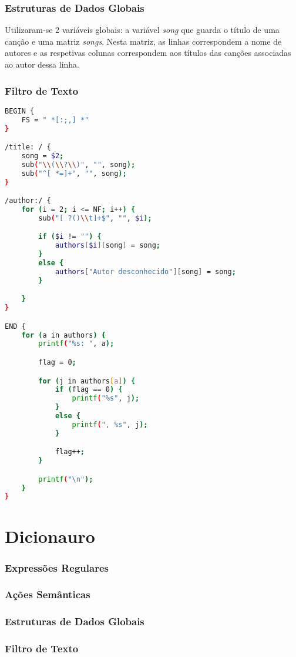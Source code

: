 \documentclass{article}
\begin{document}
\subsubsection{Estruturas de Dados Globais}

Utilizaram-se 2 variáveis globais: a variável \emph{song} que guarda o título de uma canção e uma matriz \emph{songs}. Nesta matriz, as linhas correspondem a nome de autores e as respetivas colunas correspondem aos títulos das canções associadas ao autor dessa linha.

\subsubsection{Filtro de Texto}

\begin{lstlisting}[language=bash]
BEGIN {
	FS = " *[:;,] *"
}

/title: / {
	song = $2;
	sub("\\(\\?\\)", "", song);
	sub("^[ *=]+", "", song);
}

/author:/ {
	for (i = 2; i <= NF; i++) {
		sub("[ ?()\\t]+$", "", $i);

		if ($i != "") {
			authors[$i][song] = song;
		}
		else {
			authors["Autor desconhecido"][song] = song;
		}

	}
}

END {
	for (a in authors) {
		printf("%s: ", a);

		flag = 0;		

		for (j in authors[a]) {
			if (flag == 0) {
				printf("%s", j);
			}
			else {
				printf(", %s", j);
			} 

			flag++;
		}

		printf("\n");
	}
}
\end{lstlisting}



\section{Dicionauro}

\subsubsection{Expressões Regulares}

\subsubsection{Ações Semânticas}

\subsubsection{Estruturas de Dados Globais}

\subsubsection{Filtro de Texto}
\end{document}
